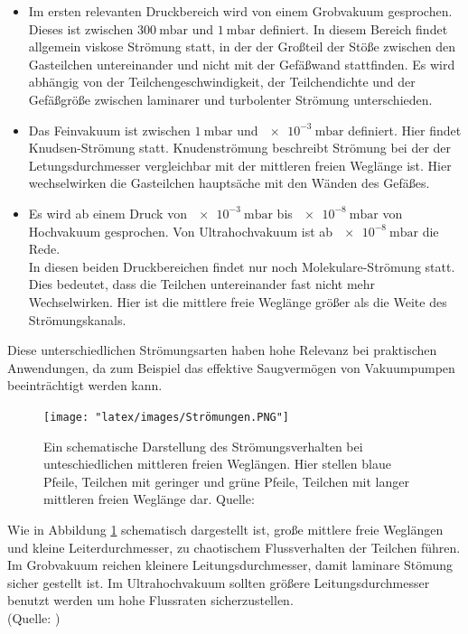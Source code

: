 		\begin{itemize}
			\item
			Im ersten relevanten Druckbereich wird von einem Grobvakuum gesprochen. Dieses ist zwischen $\SI{300}{\milli\bar}$ und $\SI{1}{\milli\bar}$ definiert.
			In diesem Bereich findet allgemein viskose Strömung statt, in der der Großteil der Stöße zwischen den Gasteilchen untereinander und nicht mit der Gefäßwand stattfinden.
			Es wird abhängig von der Teilchengeschwindigkeit, der Teilchendichte und der Gefäßgröße zwischen laminarer und turbolenter Strömung unterschieden. 

			\item
			Das Feinvakuum ist zwischen $\SI{1}{\milli\bar}$ und $\SI{e-3}{\milli\bar}$ definiert. Hier findet Knudsen-Strömung statt.
			Knudenströmung beschreibt Strömung bei der der Letungsdurchmesser vergleichbar mit der mittleren freien Weglänge ist.
			Hier wechselwirken die Gasteilchen hauptsäche mit den Wänden des Gefäßes.

			\item
			Es wird ab einem Druck von $\SI{e-3}{\milli\bar}$ bis $\SI{e-8}{\milli\bar}$ von Hochvakuum gesprochen. Von Ultrahochvakuum ist ab $\SI{e-8}{\milli\bar}$ die Rede.	\\	
			In diesen beiden Druckbereichen findet nur noch Molekulare-Strömung statt.\\
			Dies bedeutet, dass die Teilchen untereinander fast nicht mehr Wechselwirken. 
			Hier ist die mittlere freie Weglänge größer als die Weite des Strömungskanals.
		\end{itemize}
		Diese unterschiedlichen Strömungsarten haben hohe Relevanz bei praktischen Anwendungen, da zum Beispiel das effektive Saugvermögen von Vakuumpumpen beeinträchtigt werden kann.
		\begin{figure}
			\centering
			\texttt{[image: "latex/images/Strömungen.PNG"]}
			\caption{Ein schematische Darstellung des Strömungsverhalten bei unteschiedlichen mittleren freien Weglängen.
				 Hier stellen blaue Pfeile, Teilchen mit geringer und grüne Pfeile, Teilchen mit langer mittleren freien Weglänge dar. \protect Quelle: \cite{pfeiffer:pump}}
			\label{fig:stroe}
		\end{figure}  
		Wie in Abbildung \ref{fig:stroe} schematisch dargestellt ist, große mittlere freie Weglängen und kleine Leiterdurchmesser, zu chaotischem Flussverhalten der Teilchen führen.
		Im Grobvakuum reichen kleinere Leitungsdurchmesser, damit laminare Stömung sicher gestellt ist.
		Im Ultrahochvakuum sollten größere Leitungsdurchmesser benutzt werden um hohe Flussraten sicherzustellen.\\
		(Quelle: \cite{pfeiffer:grund})


